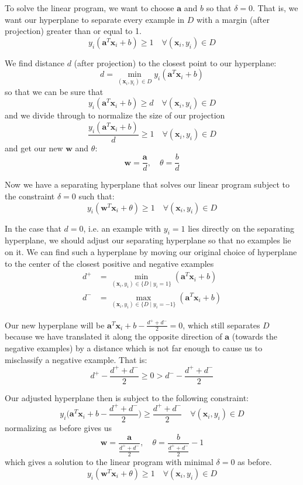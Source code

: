 \documentclass[11pt]{article}
\newenvironment{solution}{\color{blue}{\bf Solution:}}{}
\begin{document}
\begin{enumerate}
\begin{solution}
\begin{enumerate}
    To solve the linear program, we want to choose $\mathbf{a}$ and $b$ so that
    $\delta = 0$. That is, we want our hyperplane to separate every example in
    $D$ with a margin (after projection) greater than or equal to 1.
    \[
      y_i(\mathbf{a}^T\mathbf{x}_i + b) \geq 1 \quad\forall(\mathbf{x}_i, y_i) \in D
    \]

    We find distance $d$ (after projection) to the closest point to our hyperplane:
    \[
      d = \min_{(\mathbf{x}_i, y_i) \in D} y_i(\mathbf{a}^T\mathbf{x}_i + b)
    \]
    so that we can be sure that
    \[
      y_i(\mathbf{a}^T\mathbf{x}_i + b) \geq d \quad\forall(\mathbf{x}_i, y_i) \in D
    \]
    and we divide through to normalize the size of our projection 
    \[
      \dfrac{y_i(\mathbf{a}^T\mathbf{x}_i + b)}{d} \geq 1 \quad\forall(\mathbf{x}_i, y_i) \in D
    \]
    and get our new $\mathbf{w}$ and $\theta$:
    \[
      \mathbf{w} = \dfrac{\mathbf{a}}{d},\quad \theta = \dfrac{b}{d}
    \]

    Now we have a separating hyperplane that solves our linear program subject
    to the constraint $\delta = 0$ such that:
    \[
      y_i(\mathbf{w}^T \mathbf{x}_i + \theta) \geq 1 \quad\forall(\mathbf{x}_i, y_i) \in D
    \]

    In the case that $d = 0$, i.e. an example with $y_i = 1$ lies directly
    on the separating hyperplane, we should adjust our separating hyperplane so
    that no examples lie on it. We can find such a hyperplane by moving our
    original choice of hyperplane to the center of the closest positive and
    negative examples
    \begin{align*}
      d^+ &= \min_{(\mathbf{x}_i, y_i) \in \{D \mid y_i = 1\}} (\mathbf{a}^T \mathbf{x}_i + b)\\
      d^- &= \max_{(\mathbf{x}_i, y_i) \in \{D \mid y_i = -1\}} (\mathbf{a}^T \mathbf{x}_i + b)
    \end{align*}

    Our new hyperplane will be $\mathbf{a}^T \mathbf{x}_i + b - \frac{d^+ + d^-}{2} = 0$,
    which still separates $D$ because we have translated it along the opposite direction
    of $\mathbf{a}$ (towards the negative examples) by a distance which is not
    far enough to cause us to misclassify a negative example. That is:
    \[
      d^+ - \frac{d^+ + d^-}{2} \geq 0 > d^- - \frac{d^+ + d^-}{2}
    \]

    Our adjusted hyperplane then is subject to the following constraint:
    \[
      y_i \bigg(\mathbf{a}^T \mathbf{x}_i + b - \dfrac{d^+ + d^-}{2} \bigg) \geq \dfrac{d^+ + d^-}{2}  \quad\forall(\mathbf{x}_i, y_i) \in D
    \]
    normalizing as before gives us
    \[
      \mathbf{w} = \frac{\mathbf{a}}{\frac{d^+ + d^-}{2}},\quad \theta = \frac{b}{\frac{d^+ + d^-}{2}} - 1
    \]
    which gives a solution to the linear program with minimal $\delta = 0$ as
    before.
    \[
      y_i(\mathbf{w}^T \mathbf{x}_i + \theta) \geq 1 \quad\forall(\mathbf{x}_i, y_i) \in D
    \]


\end{enumerate}
\end{solution}
\end{enumerate}
\end{document}

